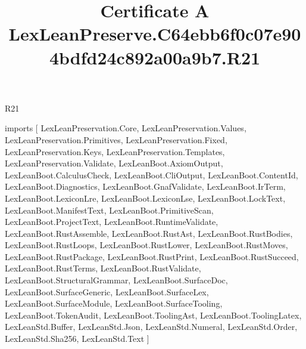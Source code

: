 \begin{lexlean}{R21}
\title{Certificate A LexLeanPreserve.C64ebb6f0c07e904bdfd24c892a00a9b7.R21}
\begin{coremodule}
imports [
  LexLeanPreservation.Core,
  LexLeanPreservation.Values,
  LexLeanPreservation.Primitives,
  LexLeanPreservation.Fixed,
  LexLeanPreservation.Keys,
  LexLeanPreservation.Templates,
  LexLeanPreservation.Validate,
  LexLeanBoot.AxiomOutput,
  LexLeanBoot.CalculusCheck,
  LexLeanBoot.CliOutput,
  LexLeanBoot.ContentId,
  LexLeanBoot.Diagnostics,
  LexLeanBoot.GnafValidate,
  LexLeanBoot.IrTerm,
  LexLeanBoot.LexiconLre,
  LexLeanBoot.LexiconLse,
  LexLeanBoot.LockText,
  LexLeanBoot.ManifestText,
  LexLeanBoot.PrimitiveScan,
  LexLeanBoot.ProjectText,
  LexLeanBoot.RuntimeValidate,
  LexLeanBoot.RustAssemble,
  LexLeanBoot.RustAst,
  LexLeanBoot.RustBodies,
  LexLeanBoot.RustLoops,
  LexLeanBoot.RustLower,
  LexLeanBoot.RustMoves,
  LexLeanBoot.RustPackage,
  LexLeanBoot.RustPrint,
  LexLeanBoot.RustSucceed,
  LexLeanBoot.RustTerms,
  LexLeanBoot.RustValidate,
  LexLeanBoot.StructuralGrammar,
  LexLeanBoot.SurfaceDoc,
  LexLeanBoot.SurfaceGeneric,
  LexLeanBoot.SurfaceLex,
  LexLeanBoot.SurfaceModule,
  LexLeanBoot.SurfaceTooling,
  LexLeanBoot.TokenAudit,
  LexLeanBoot.ToolingAst,
  LexLeanBoot.ToolingLatex,
  LexLeanStd.Buffer,
  LexLeanStd.Json,
  LexLeanStd.Numeral,
  LexLeanStd.Order,
  LexLeanStd.Sha256,
  LexLeanStd.Text
]


\end{coremodule}
\end{lexlean}
